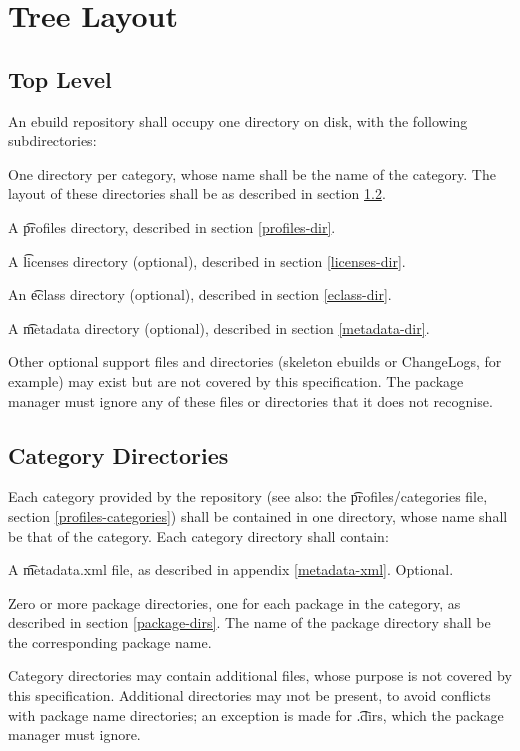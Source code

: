 \chapter{Tree Layout}

\section{Top Level}

An ebuild repository shall occupy one directory on disk, with the following subdirectories:
\begin{bulletlist}
\item One directory per category, whose name shall be the name of the category. The layout of
    these directories shall be as described in section \ref{category-dirs}.
\item A \t{profiles} directory, described in section \ref{profiles-dir}.
\item A \t{licenses} directory (optional), described in section \ref{licenses-dir}.
\item An \t{eclass} directory (optional), described in section \ref{eclass-dir}.
\item A \t{metadata} directory (optional), described in section \ref{metadata-dir}.
\item Other optional support files and directories (skeleton ebuilds or ChangeLogs,
    for example) may exist but are not covered by this specification. The package manager must
    ignore any of these files or directories that it does not recognise.

\end{bulletlist}

\section{Category Directories}
\label{category-dirs}

Each category provided by the repository (see also: the \t{profiles/categories} file, section
\ref{profiles-categories}) shall be contained in one directory, whose name shall be that of the
category. Each category directory shall contain:
\begin{bulletlist}
\item A \t{metadata.xml} file, as described in appendix \ref{metadata-xml}. Optional.
\item Zero or more package directories, one for each package in the category, as described in section
    \ref{package-dirs}. The name of the package directory shall be the corresponding package name.
\end{bulletlist}
Category directories may contain additional files, whose purpose is not covered by this
specification. Additional directories may \i{not} be present, to avoid conflicts with package
name directories; an exception is made for \t{.dirs}, which the package manager must ignore.

